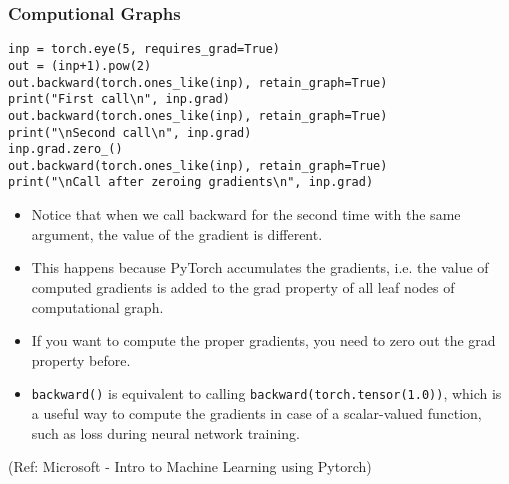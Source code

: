 \begin{frame}[fragile] \frametitle{Computional Graphs}

\begin{lstlisting}
inp = torch.eye(5, requires_grad=True)
out = (inp+1).pow(2)
out.backward(torch.ones_like(inp), retain_graph=True)
print("First call\n", inp.grad)
out.backward(torch.ones_like(inp), retain_graph=True)
print("\nSecond call\n", inp.grad)
inp.grad.zero_()
out.backward(torch.ones_like(inp), retain_graph=True)
print("\nCall after zeroing gradients\n", inp.grad)

\end{lstlisting}

\begin{itemize}
\item Notice that when we call backward for the second time with the same argument, the value of the gradient is different. 
\item This happens because PyTorch accumulates the gradients, i.e. the value of computed gradients is added to the grad property of all leaf nodes of computational graph. 
\item If you want to compute the proper gradients, you need to zero out the grad property before. 
\item \lstinline|backward()| is equivalent to calling \lstinline|backward(torch.tensor(1.0))|, which is a useful way to compute the gradients in case of a scalar-valued function, such as loss during neural network training.
\end{itemize}


\tiny{(Ref: Microsoft - Intro to Machine Learning using Pytorch)}
\end{frame}


